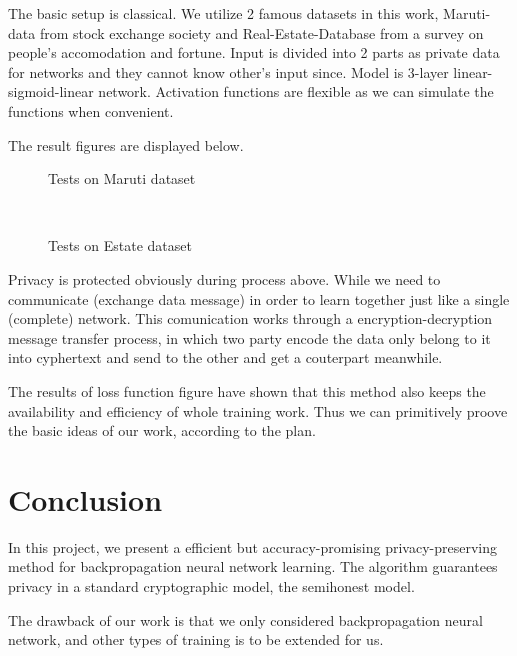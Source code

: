 \documentclass[twoside,twocolumn]{article}
\begin{document}
The basic setup is classical. We utilize 2 famous datasets in this work, Maruti-data from stock exchange society and Real-Estate-Database from a survey on people's accomodation and fortune.
Input is divided into 2 parts as private data for networks and they cannot know other's input since. Model is 3-layer linear-sigmoid-linear network. Activation functions are flexible as we can simulate the functions when convenient.

The result figures are displayed below.

\begin{figure}[htbp]
	\centering
	\centering
	\caption{Tests on Maruti dataset}
\end{figure}
~\\

\begin{figure}[htbp]
	\centering
	\centering
	\caption{Tests on Estate dataset}
\end{figure}

Privacy is protected obviously during process above. While we need to communicate (exchange data  message) in order to learn together just like a single (complete) network. This comunication works through  a encryption-decryption message transfer process, in which two party encode the data only belong to it into cyphertext and send to the other and get a couterpart meanwhile. 

The results of loss function figure have shown that this method also keeps the availability and efficiency of whole training work. Thus we can primitively proove the basic ideas of our work, according to the plan.

\section{Conclusion}
In this project, we present a efficient but accuracy-promising privacy-preserving method for backpropagation neural network learning. The algorithm guarantees privacy in a standard cryptographic model, the semihonest model.

The drawback of our work is that we only considered backpropagation neural network, and other types of training is to be extended for us.
\end{document}
